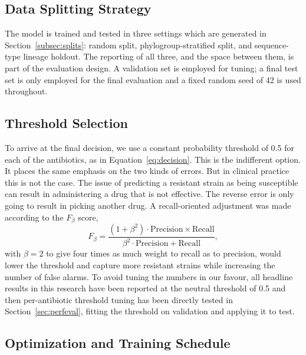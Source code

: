 \subsection{Data Splitting Strategy}

The model is trained and tested in three settings which are generated in
Section~\ref{subsec:splits}: random split, phylogroup-stratified split, and sequence-type
lineage holdout. The reporting of all three, and the space between them, is part of the
evaluation design. A validation set is employed for tuning; a final test set is only employed
for the final evaluation and a fixed random seed of 42 is used throughout.

\subsection{Threshold Selection}
\label{subsec:threshold_selection}

To arrive at the final decision, we use a constant probability threshold of 0.5 for each of the
antibiotics, as in Equation~\eqref{eq:decision}. This is the indifferent option. It places the same emphasis on the two kinds of errors. But in
clinical practice this is not the case. The issue of predicting a resistant strain as being
susceptible can result in administering a drug that is not effective. The reverse error is
only going to result in picking another drug.
A recall-oriented adjustment was made according to the $F_{\beta}$ score,
\begin{equation}
F_{\beta} = \frac{(1 + \beta^2)\cdot\text{Precision}\times\text{Recall}}{\beta^2\cdot\text{Precision} + \text{Recall}},
\label{eq:fbeta}
\end{equation}
with $\beta = 2$ to give four times as much weight to recall as to precision, would lower the
threshold and capture more resistant strains while increasing the number of false alarms. To
avoid tuning the numbers in our favour, all headline results in this research have been reported
at the neutral threshold of 0.5 and then per-antibiotic threshold tuning has been directly
tested in Section~\ref{sec:perfeval}, fitting the threshold on validation and applying it to
test.

\FloatBarrier
\subsection{Optimization and Training Schedule}

